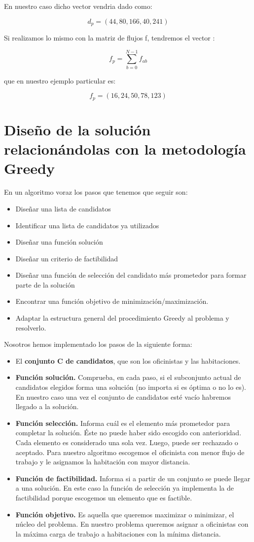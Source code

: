 \documentclass[11pt, a4paper]{article}
\theoremstyle{theorem-style}
\theoremstyle{definition-style}
\theoremstyle{remark-style}
\theoremstyle{example-style}
\begin{document}
En nuestro caso dicho vector vendria dado como:

\[
d_{p}=(44,80,166,40,241)
\]

Si realizamos lo mismo con la matriz de flujos f, tendremos el vector
:

\[
f_{p}={\displaystyle \sum_{b=0}^{N-1}f_{ab}}
\]

que en nuestro ejemplo particular es:

\[
f_{p}=(16,24,50,78,123)
\]


\section{Diseño de la solución relacionándolas con la metodología Greedy}

En un algoritmo voraz los pasos que tenemos que seguir son: 
\begin{itemize}
\item Diseñar una lista de candidatos 
\item Identificar una lista de candidatos ya utilizados 
\item Diseñar una función solución 
\item Diseñar un criterio de factibilidad
\item Diseñar una función de selección del candidato más prometedor para
formar parte de la solución 
\item Encontrar una función objetivo de minimización/maximización. 
\item Adaptar la estructura general del procedimiento Greedy al problema y resolverlo.
\end{itemize}
Nosotros hemos implementado los pasos de la siguiente forma:
\begin{itemize}
\item El \textbf{conjunto C de candidatos}, que son los oficinistas y las habitaciones.
\item \textbf{Función solución.} Comprueba, en cada paso, si el subconjunto
actual de candidatos elegidos forma una solución (no importa si es
óptima o no lo es). En nuestro caso una vez el conjunto de candidatos
esté vacío habremos llegado a la solución. 
\item \textbf{Función selección.} Informa cuál es el elemento más prometedor
para completar la solución. Éste no puede haber sido escogido con
anterioridad. Cada elemento es considerado una sola vez. Luego, puede
ser rechazado o aceptado. Para nuestro algoritmo escogemos el oficinista
con menor flujo de trabajo y le asignamos la habitación con mayor
distancia.
\item \textbf{Función de factibilidad.} Informa si a partir de un conjunto
se puede llegar a una solución. En este caso la función de selección
ya implementa la de factibilidad porque escogemos un elemento que
es factible.
\item \textbf{Función objetivo.} Es aquella que queremos maximizar o minimizar,
el núcleo del problema. En nuestro problema queremos asignar a oficinistas
con la máxima carga de trabajo a habitaciones con la mínima distancia. 
\end{itemize}
\end{document}
